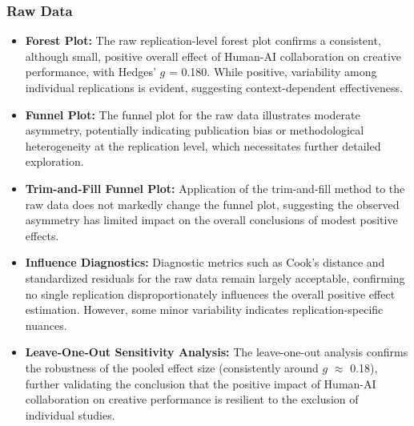 \documentclass[manuscript, screen, review, acmsmall, anonymous]{acmart}
\begin{document}
\subsubsection{Raw Data}
\begin{itemize}
  \item \textbf{Forest Plot:} The raw replication-level forest plot confirms a consistent, although small, positive overall effect of Human-AI collaboration on creative performance, with Hedges' $g$ = 0.180. While positive, variability among individual replications is evident, suggesting context-dependent effectiveness.
  \item \textbf{Funnel Plot:} The funnel plot for the raw data illustrates moderate asymmetry, potentially indicating publication bias or methodological heterogeneity at the replication level, which necessitates further detailed exploration.
  \item \textbf{Trim-and-Fill Funnel Plot:} Application of the trim-and-fill method to the raw data does not markedly change the funnel plot, suggesting the observed asymmetry has limited impact on the overall conclusions of modest positive effects.
  \item \textbf{Influence Diagnostics:} Diagnostic metrics such as Cook's distance and standardized residuals for the raw data remain largely acceptable, confirming no single replication disproportionately influences the overall positive effect estimation. However, some minor variability indicates replication-specific nuances.
  \item \textbf{Leave-One-Out Sensitivity Analysis:} The leave-one-out analysis confirms the robustness of the pooled effect size (consistently around $g$ $\approx$ 0.18), further validating the conclusion that the positive impact of Human-AI collaboration on creative performance is resilient to the exclusion of individual studies.
\end{itemize}
\end{document}
